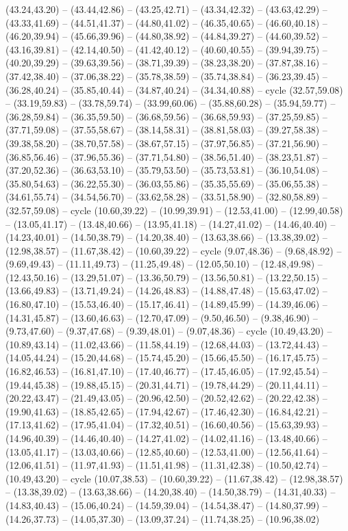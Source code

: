 {(43.24,43.20) -- (43.44,42.86) -- (43.25,42.71) -- (43.34,42.32) -- (43.63,42.29) -- (43.33,41.69) -- (44.51,41.37) -- (44.80,41.02) -- (46.35,40.65) -- (46.60,40.18) -- (46.20,39.94) -- (45.66,39.96) -- (44.80,38.92) -- (44.84,39.27) -- (44.60,39.52) -- (43.16,39.81) -- (42.14,40.50) -- (41.42,40.12) -- (40.60,40.55) -- (39.94,39.75) -- (40.20,39.29) -- (39.63,39.56) -- (38.71,39.39) -- (38.23,38.20) -- (37.87,38.16) -- (37.42,38.40) -- (37.06,38.22) -- (35.78,38.59) -- (35.74,38.84) -- (36.23,39.45) -- (36.28,40.24) -- (35.85,40.44) -- (34.87,40.24) -- (34.34,40.88) -- cycle (32.57,59.08) -- (33.19,59.83) -- (33.78,59.74) -- (33.99,60.06) -- (35.88,60.28) -- (35.94,59.77) -- (36.28,59.84) -- (36.35,59.50) -- (36.68,59.56) -- (36.68,59.93) -- (37.25,59.85) -- (37.71,59.08) -- (37.55,58.67) -- (38.14,58.31) -- (38.81,58.03) -- (39.27,58.38) -- (39.38,58.20) -- (38.70,57.58) -- (38.67,57.15) -- (37.97,56.85) -- (37.21,56.90) -- (36.85,56.46) -- (37.96,55.36) -- (37.71,54.80) -- (38.56,51.40) -- (38.23,51.87) -- (37.20,52.36) -- (36.63,53.10) -- (35.79,53.50) -- (35.73,53.81) -- (36.10,54.08) -- (35.80,54.63) -- (36.22,55.30) -- (36.03,55.86) -- (35.35,55.69) -- (35.06,55.38) -- (34.61,55.74) -- (34.54,56.70) -- (33.62,58.28) -- (33.51,58.90) -- (32.80,58.89) -- (32.57,59.08) -- cycle (10.60,39.22) -- (10.99,39.91) -- (12.53,41.00) -- (12.99,40.58) -- (13.05,41.17) -- (13.48,40.66) -- (13.95,41.18) -- (14.27,41.02) -- (14.46,40.40) -- (14.23,40.01) -- (14.50,38.79) -- (14.20,38.40) -- (13.63,38.66) -- (13.38,39.02) -- (12.98,38.57) -- (11.67,38.42) -- (10.60,39.22) -- cycle (9.07,48.36) -- (9.68,48.92) -- (9.69,49.43) -- (11.11,49.73) -- (11.25,49.48) -- (12.05,50.10) -- (12.48,49.98) -- (12.43,50.16) -- (13.29,51.07) -- (13.36,50.79) -- (13.56,50.81) -- (13.22,50.15) -- (13.66,49.83) -- (13.71,49.24) -- (14.26,48.83) -- (14.88,47.48) -- (15.63,47.02) -- (16.80,47.10) -- (15.53,46.40) -- (15.17,46.41) -- (14.89,45.99) -- (14.39,46.06) -- (14.31,45.87) -- (13.60,46.63) -- (12.70,47.09) -- (9.50,46.50) -- (9.38,46.90) -- (9.73,47.60) -- (9.37,47.68) -- (9.39,48.01) -- (9.07,48.36) -- cycle (10.49,43.20) -- (10.89,43.14) -- (11.02,43.66) -- (11.58,44.19) -- (12.68,44.03) -- (13.72,44.43) -- (14.05,44.24) -- (15.20,44.68) -- (15.74,45.20) -- (15.66,45.50) -- (16.17,45.75) -- (16.82,46.53) -- (16.81,47.10) -- (17.40,46.77) -- (17.45,46.05) -- (17.92,45.54) -- (19.44,45.38) -- (19.88,45.15) -- (20.31,44.71) -- (19.78,44.29) -- (20.11,44.11) -- (20.22,43.47) -- (21.49,43.05) -- (20.96,42.50) -- (20.52,42.62) -- (20.22,42.38) -- (19.90,41.63) -- (18.85,42.65) -- (17.94,42.67) -- (17.46,42.30) -- (16.84,42.21) -- (17.13,41.62) -- (17.95,41.04) -- (17.32,40.51) -- (16.60,40.56) -- (15.63,39.93) -- (14.96,40.39) -- (14.46,40.40) -- (14.27,41.02) -- (14.02,41.16) -- (13.48,40.66) -- (13.05,41.17) -- (13.03,40.66) -- (12.85,40.60) -- (12.53,41.00) -- (12.56,41.64) -- (12.06,41.51) -- (11.97,41.93) -- (11.51,41.98) -- (11.31,42.38) -- (10.50,42.74) -- (10.49,43.20) -- cycle (10.07,38.53) -- (10.60,39.22) -- (11.67,38.42) -- (12.98,38.57) -- (13.38,39.02) -- (13.63,38.66) -- (14.20,38.40) -- (14.50,38.79) -- (14.31,40.33) -- (14.83,40.43) -- (15.06,40.24) -- (14.59,39.04) -- (14.54,38.47) -- (14.80,37.99) -- (14.26,37.73) -- (14.05,37.30) -- (13.09,37.24) -- (11.74,38.25) -- (10.96,38.02) }
